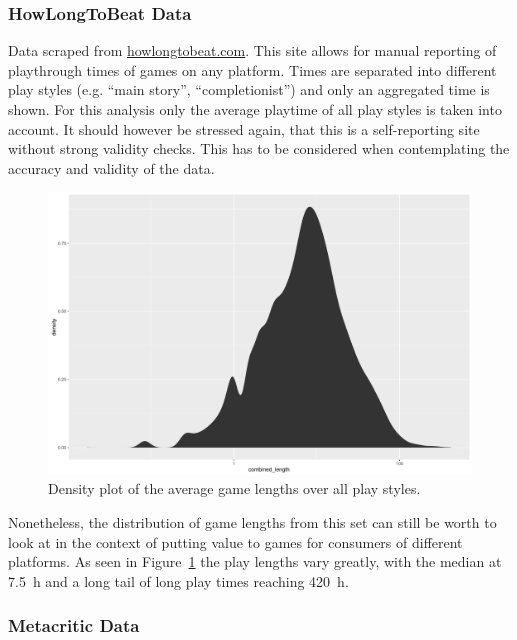 \subsubsection{HowLongToBeat Data}

Data scraped from \url{howlongtobeat.com}. This site allows for manual reporting of playthrough times of games on any platform. Times are separated into different play styles (e.g. ``main story'', ``completionist'') and only an aggregated time is shown. For this analysis only the average playtime of all play styles is taken into account.
It should however be stressed again, that this is a self-reporting site without strong validity checks. This has to be considered when contemplating the accuracy and validity of the data.

\begin{figure}[!t]
	\centering
	\includegraphics[width=1.0\columnwidth]{images/gamelengths-density.pdf}
	\caption{Density plot of the average game lengths over all play styles.}
\label{fig:gamelengths-density}
\end{figure}

Nonetheless, the distribution of game lengths from this set can still be worth to look at in the context of putting value to games for consumers of different platforms. As seen in Figure~\ref{fig:gamelengths-density} the play lengths vary greatly, with the median at \SI{7.5}{\hour} and a long tail of long play times reaching \SI{420}{\hour}.


\subsubsection{Metacritic Data}

